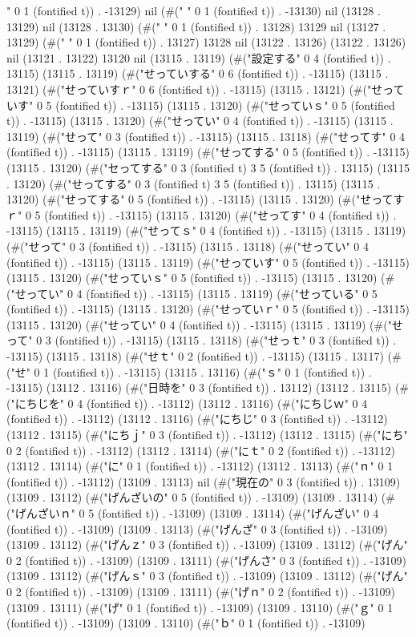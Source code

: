 " 0 1 (fontified t)) . -13129) nil (#("	" 0 1 (fontified t)) . -13130) nil (13128 . 13129) nil (13128 . 13130) (#("	" 0 1 (fontified t)) . 13128) 13129 nil (13127 . 13129) (#(" " 0 1 (fontified t)) . 13127) 13128 nil (13122 . 13126) (13122 . 13126) nil (13121 . 13122) 13120 nil (13115 . 13119) (#("設定する" 0 4 (fontified t)) . 13115) (13115 . 13119) (#("せっていする" 0 6 (fontified t)) . -13115) (13115 . 13121) (#("せっていすｒ" 0 6 (fontified t)) . -13115) (13115 . 13121) (#("せっていす" 0 5 (fontified t)) . -13115) (13115 . 13120) (#("せっていｓ" 0 5 (fontified t)) . -13115) (13115 . 13120) (#("せってい" 0 4 (fontified t)) . -13115) (13115 . 13119) (#("せって" 0 3 (fontified t)) . -13115) (13115 . 13118) (#("せってす" 0 4 (fontified t)) . -13115) (13115 . 13119) (#("せってする" 0 5 (fontified t)) . -13115) (13115 . 13120) (#("セってする" 0 3 (fontified t) 3 5 (fontified t)) . 13115) (13115 . 13120) (#("せってする" 0 3 (fontified t) 3 5 (fontified t)) . 13115) (13115 . 13120) (#("せってする" 0 5 (fontified t)) . -13115) (13115 . 13120) (#("せってすｒ" 0 5 (fontified t)) . -13115) (13115 . 13120) (#("せってす" 0 4 (fontified t)) . -13115) (13115 . 13119) (#("せってｓ" 0 4 (fontified t)) . -13115) (13115 . 13119) (#("せって" 0 3 (fontified t)) . -13115) (13115 . 13118) (#("せってい" 0 4 (fontified t)) . -13115) (13115 . 13119) (#("せっていす" 0 5 (fontified t)) . -13115) (13115 . 13120) (#("せっていｓ" 0 5 (fontified t)) . -13115) (13115 . 13120) (#("せってい" 0 4 (fontified t)) . -13115) (13115 . 13119) (#("せっている" 0 5 (fontified t)) . -13115) (13115 . 13120) (#("せっていｒ" 0 5 (fontified t)) . -13115) (13115 . 13120) (#("せってい" 0 4 (fontified t)) . -13115) (13115 . 13119) (#("せって" 0 3 (fontified t)) . -13115) (13115 . 13118) (#("せっｔ" 0 3 (fontified t)) . -13115) (13115 . 13118) (#("せｔ" 0 2 (fontified t)) . -13115) (13115 . 13117) (#("せ" 0 1 (fontified t)) . -13115) (13115 . 13116) (#("ｓ" 0 1 (fontified t)) . -13115) (13112 . 13116) (#("日時を" 0 3 (fontified t)) . 13112) (13112 . 13115) (#("にちじを" 0 4 (fontified t)) . -13112) (13112 . 13116) (#("にちじｗ" 0 4 (fontified t)) . -13112) (13112 . 13116) (#("にちじ" 0 3 (fontified t)) . -13112) (13112 . 13115) (#("にちｊ" 0 3 (fontified t)) . -13112) (13112 . 13115) (#("にち" 0 2 (fontified t)) . -13112) (13112 . 13114) (#("にｔ" 0 2 (fontified t)) . -13112) (13112 . 13114) (#("に" 0 1 (fontified t)) . -13112) (13112 . 13113) (#("ｎ" 0 1 (fontified t)) . -13112) (13109 . 13113) nil (#("現在の" 0 3 (fontified t)) . 13109) (13109 . 13112) (#("げんざいの" 0 5 (fontified t)) . -13109) (13109 . 13114) (#("げんざいｎ" 0 5 (fontified t)) . -13109) (13109 . 13114) (#("げんざい" 0 4 (fontified t)) . -13109) (13109 . 13113) (#("げんざ" 0 3 (fontified t)) . -13109) (13109 . 13112) (#("げんｚ" 0 3 (fontified t)) . -13109) (13109 . 13112) (#("げん" 0 2 (fontified t)) . -13109) (13109 . 13111) (#("げんさ" 0 3 (fontified t)) . -13109) (13109 . 13112) (#("げんｓ" 0 3 (fontified t)) . -13109) (13109 . 13112) (#("げん" 0 2 (fontified t)) . -13109) (13109 . 13111) (#("げｎ" 0 2 (fontified t)) . -13109) (13109 . 13111) (#("げ" 0 1 (fontified t)) . -13109) (13109 . 13110) (#("ｇ" 0 1 (fontified t)) . -13109) (13109 . 13110) (#("ｂ" 0 1 (fontified t)) . -13109) 